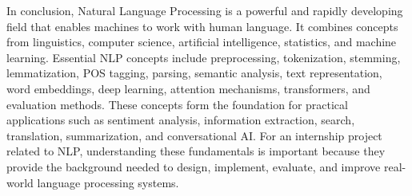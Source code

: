 \documentclass[11pt]{article}
\begin{document}
In conclusion, Natural Language Processing is a powerful and rapidly developing field that enables machines to work with human language. It combines concepts from linguistics, computer science, artificial intelligence, statistics, and machine learning. Essential NLP concepts include preprocessing, tokenization, stemming, lemmatization, POS tagging, parsing, semantic analysis, text representation, word embeddings, deep learning, attention mechanisms, transformers, and evaluation methods. These concepts form the foundation for practical applications such as sentiment analysis, information extraction, search, translation, summarization, and conversational AI. For an internship project related to NLP, understanding these fundamentals is important because they provide the background needed to design, implement, evaluate, and improve real-world language processing systems.
\end{document}
